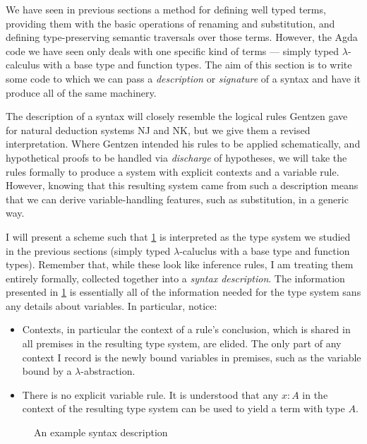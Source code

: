 We have seen in previous sections a method for defining well typed terms,
providing them with the basic operations of renaming and substitution, and
defining type-preserving semantic traversals over those terms.
However, the Agda code we have seen only deals with one specific kind of terms
--- simply typed $\lambda$-calculus with a base type and function types.
The aim of this section is to write some code to which we can pass a
\emph{description} or \emph{signature} of a syntax and have it produce all of
the same machinery.

The description of a syntax will closely resemble the logical rules Gentzen gave
for natural deduction systems NJ and NK, but we give them a revised
interpretation.
Where Gentzen intended his rules to be applied schematically, and hypothetical
proofs to be handled via \emph{discharge} of hypotheses, we will take the rules
formally to produce a system with explicit contexts and a variable rule.
However, knowing that this resulting system came from such a description means
that we can derive variable-handling features, such as substitution, in a
generic way.

I will present a scheme such that \cref{fig:app-lam} is interpreted as the type
system we studied in the previous sections (simply typed $\lambda$-caluclus with
a base type and function types).
Remember that, while these look like inference rules, I am treating them
entirely formally, collected together into a \emph{syntax description}.
The information presented in \cref{fig:app-lam} is essentially all of the
information needed for the type system sans any details about variables.
In particular, notice:
\begin{itemize}
  \item Contexts, in particular the context of a rule's conclusion, which is
    shared in all premises in the resulting type system, are elided.
    The only part of any context I record is the newly bound variables in
    premises, such as the variable bound by a $\lambda$-abstraction.
  \item There is no explicit variable rule.
    It is understood that any $x : A$ in the context of the resulting type
    system can be used to yield a term with type $A$.
\end{itemize}

\begin{figure}
  \caption{An example syntax description}
  \label{fig:app-lam}
\end{figure}

